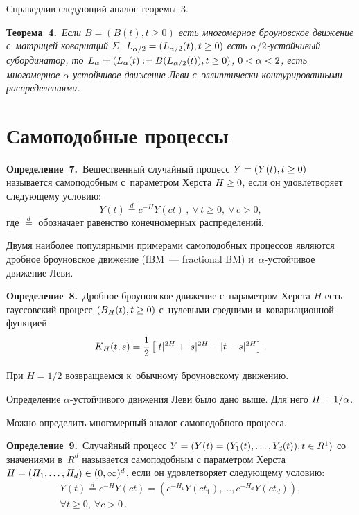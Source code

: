 \begin{multicols}{2}
Справедлив следующий аналог теоремы~3.

\smallskip

\noindent
\textbf{Теорема~4.}\
\textit{Если $B= (B(t), t\geq 0)$ есть многомерное броуновское движение с~матрицей ковариаций $\Sigma$,
$L_{\alpha/2} \hm= (L_{\alpha/2} (t) , t\hm\geq 0)$ есть $\alpha/2$-устой\-чи\-вый субординатор,
то $L_{\alpha} \hm= (L_{\alpha} (t) := B(L_{\alpha/2} (t)), t\hm\geq 0)$, 
$0\hm<\alpha \hm<2$, есть
многомерное $\alpha$-устой\-чи\-вое движение Леви с~эллиптически 
контурированными распределениями.}

\section{Самоподобные процессы}


\smallskip

\noindent
\textbf{Определение~7.}\
Вещественный случайный процесс $Y \hm= (Y(t), t\hm\geq 0)$ называется самоподобным 
с~параметром Херста $H\hm\geq 0$, если он удовлетворяет
следующему условию:
$$
Y(t) \stackrel{d}{=} c^{-H} Y(ct)\,, \ \forall\, t\geq 0, \ \forall\, c>0,
$$
где $\stackrel{d}{=}$ обозначает равенство конечномерных распределений.


\smallskip

Двумя наиболее популярными примерами самоподобных процессов являются 
дробное броуновское движение (fBM~--- fractional BM) и~$\alpha$-устой\-чи\-вое движение \mbox{Леви}.

\smallskip

\noindent
\textbf{Определение~8.}\
Дробное броуновское движение с~параметром Херста $H$ есть гауссовский процесс
$(B_H (t), t\hm\geq 0)$ с~нулевыми средними и~ковариационной функцией
$$
K_H (t,s) = \displaystyle\frac{\displaystyle 1\mathstrut}{\displaystyle 2\mathstrut} \left[ |t|^{2H} + |s|^{2H} - |t-s|^{2H} \right] \, .
$$


\smallskip

При $H=1/2$ возвращаемся к~обычному броуновскому движению.

Определение $\alpha$-устой\-чи\-во\-го движения Леви было дано выше. Для него 
$H\hm=1/\alpha$.

Можно определить многомерный аналог самоподобного процесса.

\smallskip

\noindent
\textbf{Определение~9.}\
Случайный процесс $Y = (Y(t)\hm=(Y_1 (t), \ldots, Y_d (t) ) , t\hm\in R^1 )$ со значениями 
в~$R^d$ называется самоподобным
с параметром Херста $H \hm= (H_1 , \ldots , H_d )\hm\in (0,\infty )^d$, если он 
удовлетворяет следующему условию:
\begin{multline*}
Y(t) \stackrel{d}{=} c^{-H} Y(ct) = (c^{- H_1} Y(c t_1 ) , \ldots , 
c^{- H_d} Y(c t_d )), \\ \forall t\geq 0, \ \forall c>0\,.
\end{multline*}


\end{multicols}
